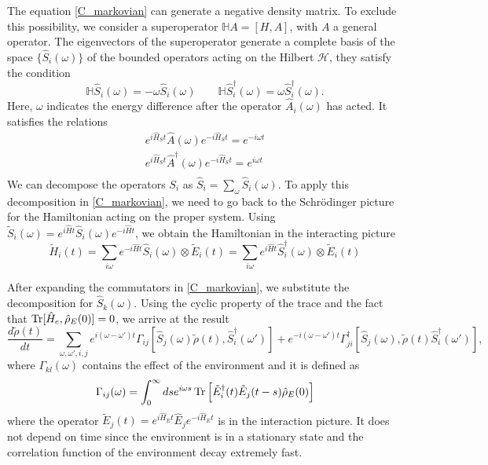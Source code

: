 The equation \eqref{C_markovian} can generate a negative density matrix. To exclude this possibility, we consider a superoperator $\mathbb{H} A = \left[H,A\right]$, with $A$ a general operator. The eigenvectors of the superoperator generate a complete basis of the space $\{\hat S_i(\omega)\}$ of the bounded operators acting on the Hilbert $\mathcal{H}$, they satisfy the condition
\begin{equation}
    \mathbb{H}\hat S_i(\omega) = -\omega \hat S_i(\omega) \qquad \mathbb{H}\hat S_i^\dagger(\omega) = \omega \hat S_i^\dagger(\omega).
\end{equation}
Here, $\omega$ indicates the energy difference after the operator $\hat A_i(\omega)$ has acted.
It satisfies the relations
\begin{equation}
    \begin{split}
        e^{i\hat H_St}\hat A(\omega)e^{-i\hat H_St} = e^{-i\omega t}\\
        e^{i\hat H_St}\hat A^\dagger(\omega)e^{-i\hat H_St} = e^{i\omega t}\\
    \end{split}
\end{equation}
We can decompose the operators $S_i$ as $\hat S_i = \sum_\omega \hat S_i(\omega)$.
To apply this decomposition in \eqref{C_markovian}, we need to go back to the Schrödinger picture for the Hamiltonian acting on the proper system. Using $\tilde S_i(\omega)=e^{i\hat Ht}\hat S_i(\omega)e^{-i\hat H t}$, we obtain the Hamiltonian in the interacting picture
\begin{equation}\label{eigen_Hamiltonian}
    \tilde H_i(t) = \sum_{i\omega} e^{-i\hat Ht}\hat S_i(\omega) \otimes \tilde E_i (t)= \sum_{i\omega} e^{i\hat Ht}\hat S_i^\dagger(\omega) \otimes \tilde E_i (t)
\end{equation}

After expanding the commutators in \eqref{C_markovian}, we substitute the decomposition for $\hat S_k(\omega)$. Using the cyclic property of the trace and the fact that $\operatorname{Tr}[\hat H_e,\hat\rho_E(0)]=0$, we arrive at the result
\begin{equation}\label{c_substitue}
    \frac{d\tilde\rho(t)}{dt} = \sum_{\omega,\omega',i,j}e^{i(\omega-\omega')t}\Gamma_{ij}\left[\hat S_j(\omega)\tilde\rho(t),\hat S_i^\dagger(\omega')\right]+ e^{-i(\omega-\omega')t}\Gamma_{ji}^\dagger\left[\hat S_j(\omega),\tilde\rho(t)\hat S_i^\dagger(\omega')\right],
\end{equation}
where $\Gamma_{kl}(\omega)$ contains the effect of the environment and it is defined as
\begin{equation}\label{environment_coefficients}
    \Gamma_{ij}(\omega) = \int_{0}^{\infty}ds e^{i\omega s}\operatorname{Tr}\left[\tilde E_i^\dagger(t)\tilde E_j(t-s)\hat\rho_E(0)\right]
\end{equation}
where the operator $\tilde E_j(t)=e^{i\hat H_E t}\hat E_j e^{-i\hat H_E t}$ is in the interaction picture. It does not depend on time since the environment is in a stationary state and the correlation function of the environment decay extremely fast.

